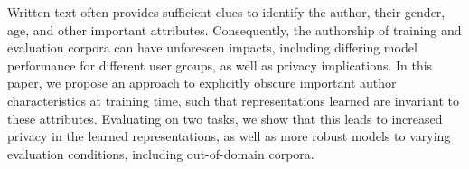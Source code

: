 Written text often provides sufficient clues to identify the author, their gender, age, and other important attributes. Consequently, the authorship of training and evaluation corpora can have unforeseen impacts, including differing model performance for different user groups, as well as privacy implications. In this paper, we propose an approach to explicitly obscure important author characteristics at training time, such that representations learned are invariant to these attributes. Evaluating on two tasks, we show that this leads to increased privacy in the learned representations, as well as more robust models to varying evaluation conditions, including out-of-domain corpora.
